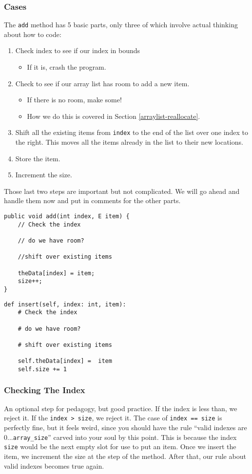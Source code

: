 \subsubsection{Cases}
The \texttt{add} method has 5 basic parts, only three of which involve actual thinking about how to code:
\begin{enumerate}
	\item Check index to see if our index in bounds
	\begin{itemize}
		\item If it is, crash the program.
	\end{itemize}
	\item Check to see if our array list has room to add a new item.
	\begin{itemize}
		\item If there is no room, make some!
		\item How we do this is covered in Section \ref{arraylist-reallocate}.
	\end{itemize}
	\item Shift all the existing items from \texttt{index} to the end of the list over one index to the right.  This moves all the items already in the list to their new locations.
	\item Store the item.
	\item Increment the size.
\end{enumerate}

Those last two steps are important but not complicated. We will go ahead and handle them now and put in comments for the other parts.

\begin{verbatim}
public void add(int index, E item) {
	// Check the index
	
	// do we have room?
	
	//shift over existing items

	theData[index] = item;
	size++;
}
\end{verbatim}

\begin{verbatim}
def insert(self, index: int, item):
	# Check the index
	
	# do we have room?
	
	# shift over existing items

	self.theData[index] =  item
	self.size += 1

\end{verbatim}


\subsubsection{Checking The Index}
An optional step for pedagogy, but good practice.  If the index is less than, we reject it. 
If the \texttt{index > size}, we reject it.
The case of \texttt{index == size} is perfectly fine, but it feels weird, since you should have the rule ``valid indexes are 0...\texttt{array\_size}'' carved into your soul by this point.  
This is because the index \texttt{size} would be the next empty slot for use to put an item. 
Once we insert the item, we increment the size at the  step of the method. 
After that, our rule about valid indexes becomes true again.


